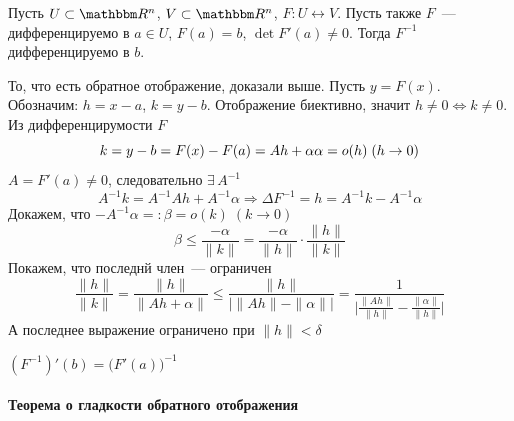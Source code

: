 \documentclass[12pt,trimbord]{../../../notes}
\begin{document}
\begin{thrm}[о дифференцируемости $F^{-1}$]\label{thrm:diffspace::invdiff}
  Пусть $U \subset \R^n$, $V \subset \R^n$, $F\colon U \leftrightarrow V$. Пусть также
  $F$~--- дифференцируемо в $a\in U$, $F(a) = b$,  $\det F'(a) \neq 0$. 
  Тогда $F^{-1}$ дифференцируемо в $b$.
\end{thrm}
\begin{ittproof}
  То, что есть обратное отображение, доказали выше. Пусть $y=F(x)$. Обозначим: $h= x-a$, $k=y-b$.
  Отображение биективно, значит $h\neq 0 \Leftrightarrow k \neq 0$.
  Из дифференцирумости $F$
  \[
    k = y - b = F(x) - F(a) = A h + \alpha \\
    \alpha = o(h) \; (h\to 0)
  \]
  $A = F'(a) \neq 0$, следовательно $\exists\, A^{-1}$
  \[
    A^{-1} k = A^{-1}Ah + A^{-1}\alpha \Rightarrow \Delta F^{-1} = h = A^{-1} k - A^{-1} \alpha
  \]
  Докажем, что $-A^{-1} \alpha =: \beta = o(k) \; (k\to 0) $
  \[
    \beta \leqslant \frac{-\alpha}{\|k\|} = \frac{-\alpha}{\|h\|}\cdot \frac{\|h\|}{\|k\|}  
  \]
  Покажем, что последнй член~--- ограничен
  \[
    \frac{\|h\|}{\|k\|} = \frac{\|h\|}{\|A h + \alpha\|} 
    \leqslant \frac{\|h\|}{\big|\|Ah\|- \|\alpha\|\big|}
    = \frac{1}{\big|\frac{\|Ah\|}{\|h\|} - \frac{\|\alpha\|}{\|h\|}\big|}  
  \]
  А последнее выражение ограничено при $\|h\| < \delta$

\end{ittproof}

\begin{cor*}
  $\displaystyle (F^{-1})'(b) = \bigl(F'(a)\bigr)^{-1}$
\end{cor*}

\paragraph{Теорема о гладкости обратного отображения}
\label{par:diffspace::invsmooth}
\end{document}
